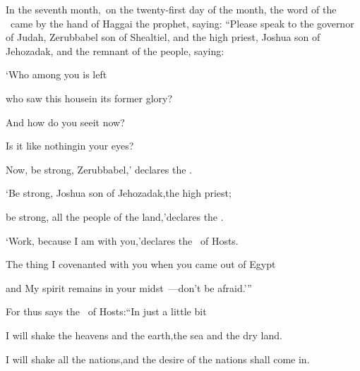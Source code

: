 
\begin{inparaenum}
  \noindent{} In the seventh month,\understood\ on the twenty-first day of the month, the word of the \lord\ came by the hand of Haggai the prophet, saying:%
   ``Please speak to the governor of Judah, Zerubbabel son of Shealtiel, and the high priest, Joshua son of Jehozadak, and the remnant of the people, saying:\smallskip%
  
  \pc {} `Who among you is left%
  
  \pd who saw this house\pa in its former glory?%
  
  \pd And how do you see\pa it now?%
  
  \pd Is it like nothing\pa in your eyes?%
  
  \pc {} Now, be strong, Zerubbabel,' declares the \lord.%
  
  \pd `Be strong, Joshua son of Jehozadak,\pa the high priest;%
  
  \pd be strong, all the people of the land,'\pa declares the \lord.%
  
  \pd `Work, because I am with you,'\pa declares the \lord\ of Hosts.%
  
  \pc {}%
  The thing%
  I covenanted with you when you came out of Egypt%
  
  \pd and My spirit remains in your midst~---\pa don't be afraid.'\thinspace''\bigskip%
  
  \pc {} For thus says the \lord\ of Hosts:\pa ``In just a little bit%
  
  \pd I will shake the heavens and the earth,\pa the sea and the dry land.%
  
  \pc {} I will shake all the nations,\pa and the desire of the nations shall come in.%
  

\end{inparaenum}

